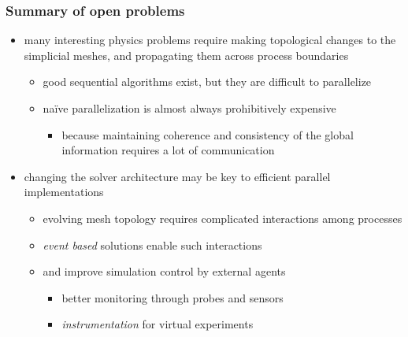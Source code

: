 \begin{frame}[fragile]
%
  \frametitle{Summary of open problems}
%
  \begin{itemize}
%
  \item many interesting physics problems require making topological changes to the simplicial
    meshes, and propagating them across process boundaries
    \begin{itemize}
    \item good sequential algorithms exist, but they are difficult to parallelize
    \item na\"ive parallelization is almost always prohibitively expensive
      \begin{itemize}
      \item because maintaining coherence and consistency of the global information requires a
        lot of communication
      \end{itemize}
    \end{itemize}
%
  \item changing the solver architecture may be key to efficient parallel implementations
    \begin{itemize}
      \item evolving mesh topology requires complicated interactions among processes
      \item {\em event based} solutions enable such interactions
      \item and improve simulation control by external agents
        \begin{itemize}
          \item better monitoring through probes and sensors
          \item {\em instrumentation} for virtual experiments
        \end{itemize}
    \end{itemize}
%
  \end{itemize}
%
\end{frame}

